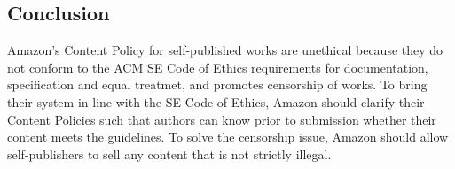 \documentclass[11pt]{article}
\begin{document}
\begin{multicols}{2}


\section{Conclusion}
Amazon's Content Policy for self-published works are unethical because they do not conform to the ACM SE Code of Ethics requirements for documentation, specification and equal treatmet, and promotes censorship of works.  To bring their system in line with the SE Code of Ethics, Amazon should clarify their Content Policies such that authors can know prior to submission whether their content meets the guidelines.  To solve the censorship issue, Amazon should allow self-publishers to sell any content that is not strictly illegal.

\end{multicols}
\newpage





\end{document}
